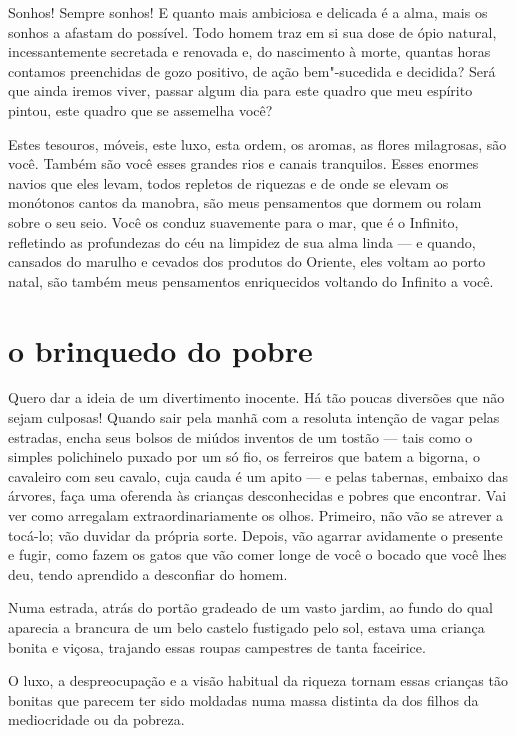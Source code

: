 Sonhos! Sempre sonhos! E quanto mais ambiciosa e delicada é a alma, mais
os sonhos a afastam do possível. Todo homem traz em si sua dose de ópio
natural, incessantemente secretada e renovada e, do nascimento à
morte, quantas horas contamos preenchidas de gozo positivo, de
ação bem"-sucedida e decidida? Será que ainda iremos viver, passar algum dia
para este quadro que meu espírito pintou, este quadro que se assemelha
você?

Estes tesouros, móveis, este luxo, esta ordem, os aromas, as
flores milagrosas, são você. Também são você esses grandes rios e
canais tranquilos. Esses enormes navios que eles levam, todos
repletos de riquezas e de onde se elevam os monótonos cantos da
manobra, são meus pensamentos que dormem ou rolam sobre o seu seio.
Você os conduz suavemente para o mar, que é o Infinito, refletindo as
profundezas do céu na limpidez de sua alma linda --- e quando,
cansados do marulho e cevados dos produtos do Oriente, eles voltam ao
porto natal, são também meus pensamentos enriquecidos voltando do
Infinito a você.

\quebra\section[O brinquedo do pobre]{o brinquedo do pobre}

Quero dar a ideia de um divertimento inocente. Há tão poucas diversões
que não sejam culposas! Quando sair pela manhã com a resoluta
intenção de vagar pelas estradas, encha seus bolsos de miúdos
inventos de um tostão --- tais como o simples polichinelo puxado por um
só fio, os ferreiros que batem a bigorna, o cavaleiro com seu cavalo,
cuja cauda é um apito --- e pelas tabernas, embaixo das
árvores, faça uma oferenda às crianças desconhecidas e pobres que
encontrar. Vai ver como arregalam extraordinariamente os olhos.
Primeiro, não vão se atrever a tocá-lo; vão duvidar da própria sorte. Depois, vão agarrar avidamente o presente e fugir, como fazem os
gatos que vão comer longe de você o bocado que você lhes
deu, tendo aprendido a desconfiar do homem.

Numa estrada, atrás do portão gradeado de um vasto jardim, ao fundo do qual aparecia
a brancura de um belo castelo fustigado pelo sol, estava uma
criança bonita e viçosa, trajando essas roupas campestres de tanta
faceirice.

O luxo, a despreocupação e a visão habitual da riqueza tornam essas
crianças tão bonitas que parecem ter sido moldadas numa massa distinta da
dos filhos da mediocridade ou da pobreza.

